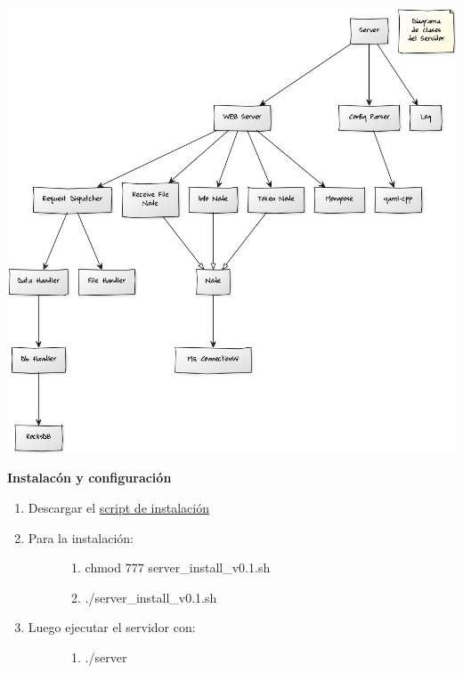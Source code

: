 \documentclass[letterpaper,10pt,english]{sphinxmanual}
\begin{document}
\includegraphics{diagrama_clase_serv.png}

\textbf{Instalacón y configuración}
\begin{enumerate}
\item {} 
Descargar el \href{https://raw.githubusercontent.com/martineq/tp7552/master/server/server\_install\_v0.1.sh}{script de instalación}

\item {} \begin{description}
\item[{Para la instalación:}] \leavevmode\begin{enumerate}
\item {} 
chmod 777 server\_install\_v0.1.sh

\item {} 
./server\_install\_v0.1.sh

\end{enumerate}

\end{description}

\item {} \begin{description}
\item[{Luego ejecutar el servidor con:}] \leavevmode\begin{enumerate}
\item {} 
./server

\end{enumerate}

\end{description}

\end{enumerate}
\end{document}
